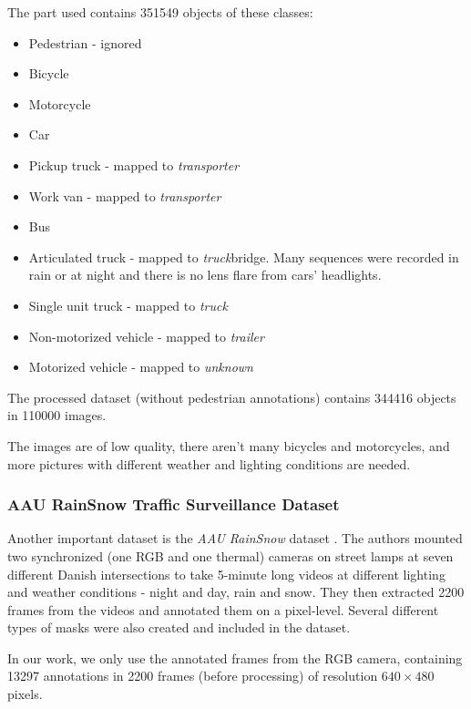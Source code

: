 The part used contains \num{351549} objects of these classes:
\begin{itemize}
    \item Pedestrian - ignored
    \item Bicycle
    \item Motorcycle
    \item Car
    \item Pickup truck - mapped to \textit{transporter}
    \item Work van - mapped to \textit{transporter}
    \item Bus
    \item Articulated truck - mapped to \textit{truck}bridge. Many sequences were recorded in rain or at night and there is no lens flare from
    cars' headlights.
    \item Single unit truck - mapped to \textit{truck}
    \item Non-motorized vehicle - mapped to \textit{trailer}
    \item Motorized vehicle - mapped to \textit{unknown}
\end{itemize}
The processed dataset (without pedestrian annotations) contains \num{344416}
objects in \num{110000} images.

The images are of low quality, there aren't many bicycles and motorcycles, and
more pictures with different weather and lighting conditions are needed.



\subsubsection*{AAU RainSnow Traffic Surveillance Dataset}
\label{AAUDataset}

Another important dataset is the \textit{AAU RainSnow} dataset
\cite{Bahnsen2019}. The authors mounted two synchronized (one RGB and one
thermal) cameras on street lamps at seven different Danish intersections to take
5-minute long videos at different lighting and weather conditions - night and
day, rain and snow. They then extracted \num{2200} frames from the videos and
annotated them on a pixel-level. Several different types of masks were also
created and included in the dataset.

In our work, we only use the annotated frames from the RGB camera, containing
\num{13297} annotations in \num{2200} frames (before processing) of resolution
$640 \times 480$ pixels. 

